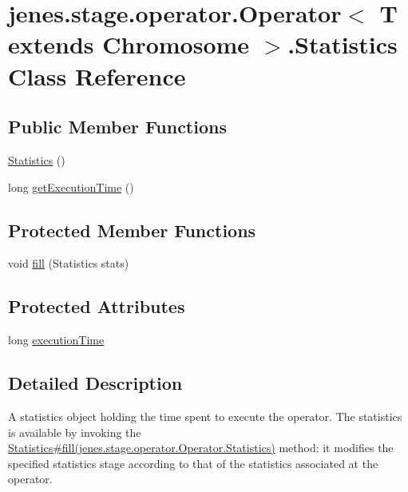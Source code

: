 \hypertarget{classjenes_1_1stage_1_1operator_1_1_operator_3_01_t_01extends_01_chromosome_01_4_1_1_statistics}{
\section{jenes.stage.operator.Operator$<$ T extends Chromosome $>$.Statistics Class Reference}
\label{classjenes_1_1stage_1_1operator_1_1_operator_3_01_t_01extends_01_chromosome_01_4_1_1_statistics}
}
\subsection*{Public Member Functions}
\begin{CompactItemize}
\item 
\hyperlink{classjenes_1_1stage_1_1operator_1_1_operator_3_01_t_01extends_01_chromosome_01_4_1_1_statistics_daa59a7b449045b5fd3c9abd3fbecf23}{Statistics} ()
\item 
long \hyperlink{classjenes_1_1stage_1_1operator_1_1_operator_3_01_t_01extends_01_chromosome_01_4_1_1_statistics_7ad4b3ece9b2cdbf4a9142eda087a12d}{getExecutionTime} ()
\end{CompactItemize}
\subsection*{Protected Member Functions}
\begin{CompactItemize}
\item 
void \hyperlink{classjenes_1_1stage_1_1operator_1_1_operator_3_01_t_01extends_01_chromosome_01_4_1_1_statistics_26f2fb7bb11b9d05d95705ec95f470cf}{fill} (Statistics stats)
\end{CompactItemize}
\subsection*{Protected Attributes}
\begin{CompactItemize}
\item 
long \hyperlink{classjenes_1_1stage_1_1operator_1_1_operator_3_01_t_01extends_01_chromosome_01_4_1_1_statistics_3e7fc955df9ca708795c24336b12f937}{executionTime}
\end{CompactItemize}


\subsection{Detailed Description}
A statistics object holding the time spent to execute the operator. The statistics is available by invoking the \hyperlink{}{Statistics\#fill(jenes.stage.operator.Operator.Statistics)} method: it modifies the specified statistics stage according to that of the statistics associated at the operator. 

